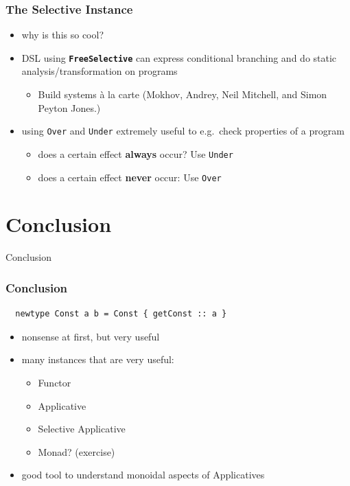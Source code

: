 \documentclass[aspectratio=169]{beamer}
\begin{document}
\begin{frame}[fragile]
  \frametitle{The Selective Instance}
  \begin{itemize}
  \item why is this so cool?
  \item DSL using \textbf{\texttt{FreeSelective}} can express conditional branching and do
    static analysis/transformation on programs
    \begin{itemize}
    \item Build systems à la carte (Mokhov, Andrey, Neil Mitchell, and Simon Peyton Jones.)
    \end{itemize}
  \item using \texttt{Over} and \texttt{Under} extremely useful to e.g.\ check properties of a program
    \begin{itemize}
    \item does a certain effect \textbf{always} occur? Use \texttt{Under}
    \item does a certain effect \textbf{never} occur: Use \texttt{Over}
    \end{itemize}
  \end{itemize}
\end{frame}

\section{Conclusion}
\begin{frame}
  \begin{center}
    \Huge Conclusion
  \end{center}
\end{frame}

\begin{frame}[fragile]
  \frametitle{Conclusion}
  \begin{verbatim}
  newtype Const a b = Const { getConst :: a }
  \end{verbatim}
  \begin{itemize}
  \item nonsense at first, but very useful
  \item many instances that are very useful:
    \begin{itemize}
    \item Functor
    \item Applicative
    \item Selective Applicative
    \item Monad? (exercise)
    \end{itemize}
  \item good tool to understand monoidal aspects of Applicatives
  \end{itemize}
\end{frame}
\end{document}
